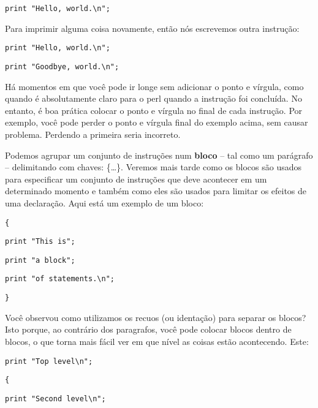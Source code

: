 \documentclass[a4paper,12pt,twoside]{book}
\begin{document}
\noindent 

\noindent \texttt{print "Hello, world.\textbackslash n";}

\noindent 

\noindent Para imprimir alguma coisa novamente, então nós escrevemos outra instrução:

\noindent 

\noindent 

\noindent \texttt{print "Hello, world.\textbackslash n";}

\noindent \texttt{print "Goodbye, world.\textbackslash n";}

\noindent 

\noindent Há momentos em que você pode ir longe sem adicionar o ponto e vírgula, 
como quando é absolutamente claro para o perl quando a instrução foi concluída. 
No entanto, é boa prática colocar o ponto e vírgula no final de cada instrução. 
Por exemplo, você pode perder o ponto e vírgula final do exemplo acima, sem causar problema. 
Perdendo a primeira seria incorreto.\medskip

\noindent 

\noindent Podemos agrupar um conjunto de instruções num  
\textbf{bloco }-- tal como um parágrafo -- delimitando com chaves: \{\dots \}. 
Veremos mais tarde como os blocos são usados para especificar um conjunto de 
instruções que deve acontecer em um determinado momento e também como eles são 
usados para limitar os efeitos de uma declaração. Aqui está um exemplo de um bloco:

\noindent 

\noindent \texttt{\{}

\noindent \texttt{print "This is";}

\noindent \texttt{print "a block";}

\noindent \texttt{print "of statements.\textbackslash n";}

\noindent \texttt{\}}

\noindent 

\noindent Você observou como utilizamos os recuos (ou identação) para separar os blocos? 
Isto porque, ao contrário dos paragrafos, você pode colocar blocos dentro de blocos,
o que torna mais fácil ver em que nível as coisas estão acontecendo. Este:

\noindent 

\noindent \texttt{print "Top level\textbackslash n";}

\noindent \texttt{\{}

\noindent \texttt{print "Second level\textbackslash n";}
\end{document}
